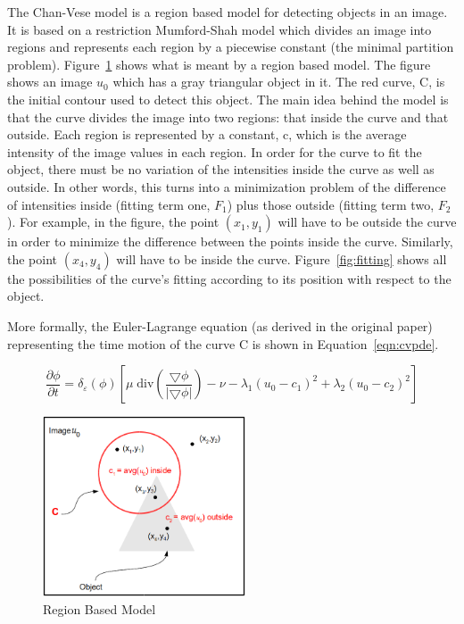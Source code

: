 \documentclass[10pt,twocolumn,letterpaper]{article}
\begin{document}
The Chan-Vese model is a region based model for detecting objects in an image. It is based on a restriction Mumford-Shah model which divides an image into
regions and represents each region by a piecewise constant (the minimal partition problem). Figure~\ref{fig:region} shows what is meant by a region based
model. The figure shows an image $u_{0}$ which has a gray triangular object in it. The red curve, C, is the initial contour used to detect this object. The
main idea behind the model is that the curve divides the image into two regions: that inside the curve and that outside. Each region is represented by a
constant, c, which is the average intensity of the image values in each region. In order for the curve to fit the object, there must be no variation of the
intensities inside the curve as well as outside. In other words, this turns into a minimization problem of the difference of intensities inside (fitting term
one, $F_{1}$) plus those
outside (fitting term two, $F_{2}$). For example, in the figure, the point $(x_{1},y_{1})$ will have to be outside the curve in order to minimize the difference
between the points inside
the curve. Similarly, the point $(x_{4}, y_{4})$ will have to be inside the curve. Figure~\ref{fig:fitting} shows all the possibilities of the curve's fitting
according to its position with respect to the object.

More formally, the Euler-Lagrange equation (as derived in the original paper) representing the time motion of the curve C is shown in Equation~\ref{eqn:cvpde}.

\begin{equation}
\label{eqn:cvpde}
\frac{\partial{\phi}}{\partial{t}} = \delta_{\varepsilon}(\phi)[\mu\; \mathrm{div}(\frac{\bigtriangledown \phi}{|\bigtriangledown \phi|}) - \nu -
\lambda_{1}(u_{0} - c_{1})^2 +\lambda_{2}(u_{0} - c_{2})^2] 
\end{equation}

\begin{figure}[t]
\centering
\includegraphics[width=6cm]{explaining.png}
\caption{Region Based Model}
\label{fig:region}
\end{figure}
\end{document}
